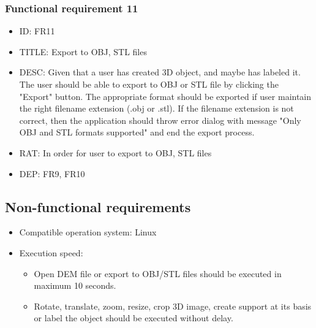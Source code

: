 \documentclass[11pt]{article}
\begin{document}
\subsubsection{Functional requirement 11}
\begin{itemize}
\item ID: FR11
\item TITLE: Export to OBJ, STL files
\item DESC: Given that a user has created 3D object, and maybe has labeled it. The user should be able to export to OBJ or STL file by clicking the "Export" button. The appropriate format should be exported if user maintain the right filename extension (.obj or .stl). If the filename extension is not correct, then the application should throw error dialog with message "Only OBJ and STL formats supported" and end the export process.
\item RAT: In order for user to export to OBJ, STL files
\item DEP: FR9, FR10
\end{itemize}
\subsection{Non-functional requirements}
\begin{itemize}
\item Compatible operation system: Linux
\item Execution speed: 
\begin{itemize}
\item Open DEM file or export to OBJ/STL files should be executed in maximum 10 seconds. 
\item Rotate, translate, zoom, resize, crop 3D image, create support at its basis or label the object should be executed without delay. 
\end{itemize}
\end{itemize}
\end{document}
